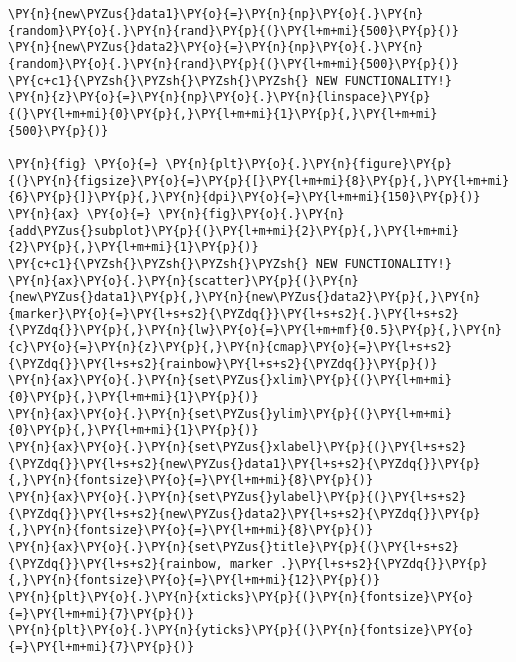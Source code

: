     \begin{tcolorbox}[breakable, size=fbox, boxrule=1pt, pad at break*=1mm,colback=cellbackground, colframe=cellborder]
\begin{Verbatim}[commandchars=\\\{\}]
\PY{n}{new\PYZus{}data1}\PY{o}{=}\PY{n}{np}\PY{o}{.}\PY{n}{random}\PY{o}{.}\PY{n}{rand}\PY{p}{(}\PY{l+m+mi}{500}\PY{p}{)}
\PY{n}{new\PYZus{}data2}\PY{o}{=}\PY{n}{np}\PY{o}{.}\PY{n}{random}\PY{o}{.}\PY{n}{rand}\PY{p}{(}\PY{l+m+mi}{500}\PY{p}{)}
\PY{c+c1}{\PYZsh{}\PYZsh{}\PYZsh{}\PYZsh{} NEW FUNCTIONALITY!}
\PY{n}{z}\PY{o}{=}\PY{n}{np}\PY{o}{.}\PY{n}{linspace}\PY{p}{(}\PY{l+m+mi}{0}\PY{p}{,}\PY{l+m+mi}{1}\PY{p}{,}\PY{l+m+mi}{500}\PY{p}{)}

\PY{n}{fig} \PY{o}{=} \PY{n}{plt}\PY{o}{.}\PY{n}{figure}\PY{p}{(}\PY{n}{figsize}\PY{o}{=}\PY{p}{[}\PY{l+m+mi}{8}\PY{p}{,}\PY{l+m+mi}{6}\PY{p}{]}\PY{p}{,}\PY{n}{dpi}\PY{o}{=}\PY{l+m+mi}{150}\PY{p}{)} 
\PY{n}{ax} \PY{o}{=} \PY{n}{fig}\PY{o}{.}\PY{n}{add\PYZus{}subplot}\PY{p}{(}\PY{l+m+mi}{2}\PY{p}{,}\PY{l+m+mi}{2}\PY{p}{,}\PY{l+m+mi}{1}\PY{p}{)}
\PY{c+c1}{\PYZsh{}\PYZsh{}\PYZsh{}\PYZsh{} NEW FUNCTIONALITY!}
\PY{n}{ax}\PY{o}{.}\PY{n}{scatter}\PY{p}{(}\PY{n}{new\PYZus{}data1}\PY{p}{,}\PY{n}{new\PYZus{}data2}\PY{p}{,}\PY{n}{marker}\PY{o}{=}\PY{l+s+s2}{\PYZdq{}}\PY{l+s+s2}{.}\PY{l+s+s2}{\PYZdq{}}\PY{p}{,}\PY{n}{lw}\PY{o}{=}\PY{l+m+mf}{0.5}\PY{p}{,}\PY{n}{c}\PY{o}{=}\PY{n}{z}\PY{p}{,}\PY{n}{cmap}\PY{o}{=}\PY{l+s+s2}{\PYZdq{}}\PY{l+s+s2}{rainbow}\PY{l+s+s2}{\PYZdq{}}\PY{p}{)}
\PY{n}{ax}\PY{o}{.}\PY{n}{set\PYZus{}xlim}\PY{p}{(}\PY{l+m+mi}{0}\PY{p}{,}\PY{l+m+mi}{1}\PY{p}{)}
\PY{n}{ax}\PY{o}{.}\PY{n}{set\PYZus{}ylim}\PY{p}{(}\PY{l+m+mi}{0}\PY{p}{,}\PY{l+m+mi}{1}\PY{p}{)}
\PY{n}{ax}\PY{o}{.}\PY{n}{set\PYZus{}xlabel}\PY{p}{(}\PY{l+s+s2}{\PYZdq{}}\PY{l+s+s2}{new\PYZus{}data1}\PY{l+s+s2}{\PYZdq{}}\PY{p}{,}\PY{n}{fontsize}\PY{o}{=}\PY{l+m+mi}{8}\PY{p}{)}
\PY{n}{ax}\PY{o}{.}\PY{n}{set\PYZus{}ylabel}\PY{p}{(}\PY{l+s+s2}{\PYZdq{}}\PY{l+s+s2}{new\PYZus{}data2}\PY{l+s+s2}{\PYZdq{}}\PY{p}{,}\PY{n}{fontsize}\PY{o}{=}\PY{l+m+mi}{8}\PY{p}{)}
\PY{n}{ax}\PY{o}{.}\PY{n}{set\PYZus{}title}\PY{p}{(}\PY{l+s+s2}{\PYZdq{}}\PY{l+s+s2}{rainbow, marker .}\PY{l+s+s2}{\PYZdq{}}\PY{p}{,}\PY{n}{fontsize}\PY{o}{=}\PY{l+m+mi}{12}\PY{p}{)}
\PY{n}{plt}\PY{o}{.}\PY{n}{xticks}\PY{p}{(}\PY{n}{fontsize}\PY{o}{=}\PY{l+m+mi}{7}\PY{p}{)}
\PY{n}{plt}\PY{o}{.}\PY{n}{yticks}\PY{p}{(}\PY{n}{fontsize}\PY{o}{=}\PY{l+m+mi}{7}\PY{p}{)}


\end{Verbatim}
\end{tcolorbox}
